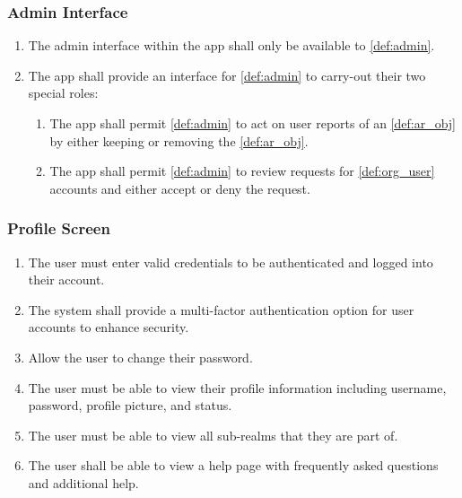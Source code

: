 \documentclass{article}
\begin{document}
\subsubsection{Admin Interface}
\label{ssub:admin_interface}

\begin{enumerate}[align=left, label=\textbf{AI-FR\arabic*:}]
    \item The admin interface within the app shall only be available to \ref{def:admin}.
    \item The app shall provide an interface for \ref{def:admin} to carry-out their two special roles:
          \begin{enumerate}[align=left, label=\textbf{AI-FR2.\arabic*:}]
              \item The app shall permit \ref{def:admin} to act on user reports of an \ref{def:ar_obj} by either keeping or removing the \ref{def:ar_obj}.
              \item The app shall permit \ref{def:admin} to review requests for \ref{def:org_user} accounts and either accept or deny the request.
          \end{enumerate}
\end{enumerate}

\subsubsection{Profile Screen}
\label{ssub:profile_screen}
\begin{enumerate}[align=left, label=\textbf{PS-FR\arabic*:}]
    \item The user must enter valid credentials to be authenticated and logged into their account.
    \item The system shall provide a multi-factor authentication option for user accounts to enhance security. \\
    \item Allow the user to change their password.
    \item The user must be able to view their profile information including username, password, profile picture, and status.
    \item The user must be able to view all sub-realms that they are part of.
    \item The user shall be able to view a help page with frequently asked questions and additional help.
\end{enumerate}
\end{document}
